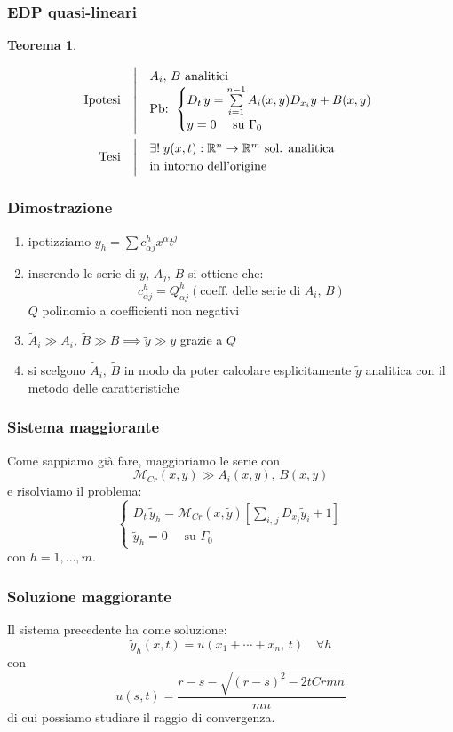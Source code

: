 \documentclass[serif,notheorems]{beamer}
\makeatletter
\newenvironment{ipotesi}%
{\quad\left|\quad\def\arraystretch{1.2}\begin{array}{@{}l@{}}}%
{\end{array}\right.}
\newcommand{\hpth}[2]
{
\begin{align*}
\quad
\text{Ipotesi}
&\begin{ipotesi}
#1
\end{ipotesi}\\
\text{Tesi}
&\begin{ipotesi}
#2
\end{ipotesi}
\end{align*}
}
\theoremstyle{definition} %
\newtheorem{theorem}{Teorema}[section] %
\theoremstyle{remark}
\makeatother
\begin{document}
\begin{frame}
\frametitle{EDP quasi-lineari}
\begin{theorem}\label{teoquasilin}
\hpth{
A_i , \, B\text{ analitici }\\
\text{Pb: }
\begin{cases}
D_t \, y = \sum\limits_{i=1}^{n-1} A_i(x,y)D_{x_i}y+B(x,y) \; \\
y=0 \quad \text{ su } \Gamma_0
\end{cases}
\\
}{
\exists ! \; y(x,t): \mathbb{R}^n \rightarrow \mathbb{R}^m
\text{ sol. analitica} \\ \text{in intorno dell'origine}
}
\end{theorem}
\end{frame}

\begin{frame}
\frametitle{Dimostrazione}
\begin{enumerate}
\item ipotizziamo $y_h = \sum c^h_{\alpha j} x^\alpha t^j$
\item inserendo le serie di $y,\, A_j,\, B$ si ottiene che: 
$$ c^h_{\alpha j} = Q^h_{\alpha j}(\text{coeff. delle serie di }A_i, \, B)$$
$Q$ polinomio a coefficienti non negativi
\item $\widetilde{A}_i \gg A_i, \, \widetilde{B} \gg B \implies \widetilde{y} \gg y$ grazie a $Q$
\item si scelgono $\widetilde{A}_i, \, \widetilde{B}$ in modo da poter calcolare esplicitamente $\widetilde{y}$ analitica con il metodo delle caratteristiche
\end{enumerate}
\end{frame}

\begin{frame}
\frametitle{Sistema maggiorante}
Come sappiamo già fare, maggioriamo le serie con 
$$\mathcal{M}_{Cr}(x,y) \gg A_i(x,y),\, B(x,y)$$
e risolviamo il problema:
\begin{equation*}
\begin{cases}
D_t \, \widetilde{y}_h = \mathcal{M}_{Cr} (x,\widetilde{y}) \left[\sum\limits_{i,\, j} D_{x_j}\widetilde{y}_i+1 \right] \\
\widetilde{y}_h=0 \quad \text{ su } \Gamma_0
\end{cases}
\end{equation*}
con $h=1,\ldots, m$.
\end{frame}

\begin{frame}
\frametitle{Soluzione maggiorante}
Il sistema precedente ha come soluzione:
$$\widetilde{y}_h(x,t)=u(x_1+\cdots +x_n,\,t) \quad \forall h$$
con
$$u(s,t)=\frac{r-s-\sqrt{(r-s)^2-2tCrmn}}{mn}$$
di cui possiamo studiare il raggio di convergenza.
\end{frame}
\end{document}
